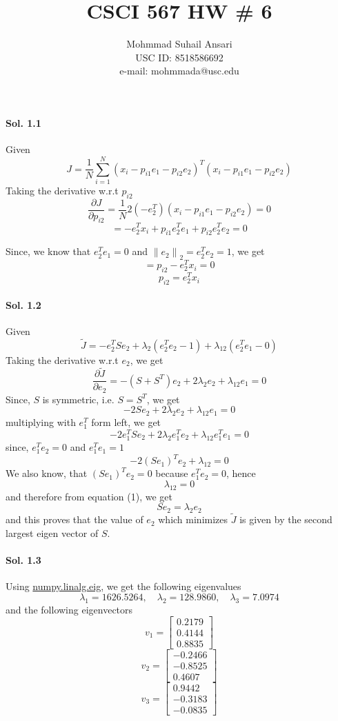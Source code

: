 \documentclass[]{report}
\title{CSCI 567 HW \# 6}
\author{Mohmmad Suhail Ansari \\ USC ID: 8518586692\\e-mail: mohmmada@usc.edu}
\begin{document}
\maketitle

\paragraph{Sol. 1.1}
	Given 
	\[ J = \frac{1}{N} \sum_{i=1}^N {(x_i - p_{i1} e_1 - p_{i2} e_2)}^T (x_i - p_{i1} e_1 - p_{i2} e_2) \]
	Taking the derivative w.r.t $p_{i2}$
	\[ \frac{\partial{J}}{\partial{p_{i2}}} = \frac{1}{N} 2  (- e_2^T) (x_i - p_{i1} e_1 - p_{i2} e_2) = 0\]
	\[ = -e_2^T x_i + p_{i1} e_2^T e_1 + p_{i2} e_2^T e_2 = 0\]

	Since, we know that $e_2^T e_1 = 0$ and $ {\|e_2\|}_2 = e_2^T e_2 = 1$, we get
	\[ = p_{i2} - e_2^T x_i = 0 \]
	\[ p_{i2} = e_2^T x_i \]

\paragraph{Sol. 1.2}
	Given 
	\[ \tilde{J} = -e_2^T S e_2 + \lambda_2 {(e_2^T e_2 - 1)}  + \lambda_{12} {(e_2^T e_1 - 0)} \]
	Taking the derivative w.r.t $e_{2}$, we get 
	\begin{equation}
		 \frac{\partial{\tilde{J}}}{\partial{e_2}} = -(S + S^T)e_2 + 2 \lambda_2 e_2 + \lambda_{12}e_1 = 0
	\end{equation}
	Since, $S$ is symmetric, i.e. $S = S^T$, we get 
	\[ -2Se_2 + 2\lambda_2 e_2 + \lambda_{12} e_1 = 0\]
	multiplying with $e_1^T$ form left, we get 
	\[ -2 e_1^T S e_2 + 2 \lambda_2 e_1^T e_2 + \lambda_{12} e_1^T e_1  = 0 \]
	since, $ e_1^T e_2  = 0$ and $e_1^T e_1 = 1$
	\[ -2 {(Se_1)}^T e_2 + \lambda_{12} = 0	\]
	We also know, that ${(Se_1)}^T e_2 = 0$ because $ e_1^T e_2  = 0$, hence 
	\[ \lambda_{12} = 0\]
	and therefore from equation (1), we get 
	\[ Se_2 = \lambda_2 e_2 \]
	and this proves that the value of $e_2$ which minimizes $\tilde{J}$ is given by the second largest eigen vector of $S$.

\paragraph{Sol. 1.3}
	Using \href{https://docs.scipy.org/doc/numpy/reference/generated/numpy.linalg.eig.html}{numpy.linalg.eig}, we get the following eigenvalues
	\[\lambda_1 = 1626.5264,\quad \lambda_2 = 128.9860,\quad \lambda_3 = 7.0974 \]
	and the following eigenvectors
	\[ 
		v_1 = \begin{bmatrix}
				0.2179\\
				0.4144\\
				0.8835
			\end{bmatrix}
	\]\[	
		v_2 = \begin{bmatrix}
			-0.2466 \\
			-0.8525 \\
			0.4607
		\end{bmatrix}
	\]\[	
		v_3 = \begin{bmatrix}
			0.9442 \\
			-0.3183\\
			-0.0835
		\end{bmatrix}
	\]
\end{document}
